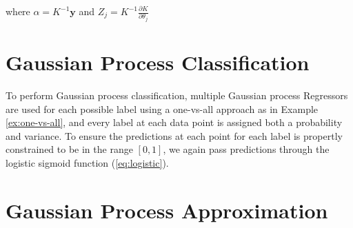 where $\alpha = K^{-1}\mathbf{y}$ and $Z_j = K^{-1} \frac{\partial{K}}{\partial{\theta_j}}$


\section{Gaussian Process Classification} \label{chapsec:gpc}

To perform Gaussian process classification, multiple Gaussian process Regressors are used for each possible label using a one-vs-all approach as in Example \autoref{ex:one-vs-all}, and every label at each data point is assigned both a probability and variance. To ensure the predictions at each point for each label is propertly constrained to be in the range $[0,1]$, we again pass predictions through the logistic sigmoid function (\autoref{eq:logistic}).


% 

\section{Gaussian Process Approximation} \label{chapsec:gp-approx}

